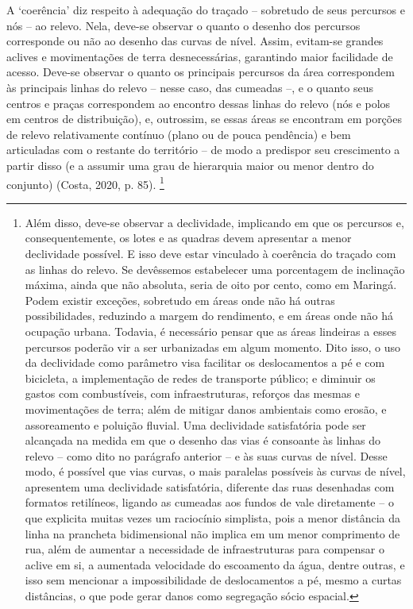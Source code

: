 \documentclass[12pt, a4paper]{book} %
\begin{document}
        A `coerência' diz respeito à adequação do traçado – sobretudo de seus percursos e nós – ao relevo. Nela, deve-se observar o quanto o desenho dos percursos corresponde ou não ao desenho das curvas de nível. Assim, evitam-se grandes aclives e movimentações de terra desnecessárias, garantindo maior facilidade de acesso. Deve-se observar o quanto os principais percursos da área correspondem às principais linhas do relevo – nesse caso, das cumeadas –, e o quanto seus centros e praças correspondem ao encontro dessas linhas do relevo (nós e polos em centros de distribuição), e, outrossim, se essas áreas se encontram em porções de relevo relativamente contínuo (plano ou de pouca pendência) e bem articuladas com o restante do território – de modo a predispor seu crescimento a partir disso (e a assumir uma grau de hierarquia maior ou menor dentro do conjunto) (Costa, 2020, p. 85). \footnote[102]{Além disso, deve-se observar a declividade, implicando em que os percursos e, consequentemente, os lotes e as quadras devem apresentar a menor declividade possível. E isso deve estar vinculado à coerência do traçado com as linhas do relevo. Se devêssemos estabelecer uma porcentagem de inclinação máxima, ainda que não absoluta, seria de oito por cento, como em Maringá. Podem existir exceções, sobretudo em áreas onde não há outras possibilidades, reduzindo a margem do rendimento, e em áreas onde não há ocupação urbana. Todavia, é necessário pensar que as áreas lindeiras a esses percursos poderão vir a ser urbanizadas em algum momento. Dito isso, o uso da declividade como parâmetro visa facilitar os deslocamentos a pé e com bicicleta, a implementação de redes de transporte público; e diminuir os gastos com combustíveis, com infraestruturas, reforços das mesmas e movimentações de terra; além de mitigar danos ambientais como erosão, e assoreamento e poluição fluvial. Uma declividade satisfatória pode ser alcançada na medida em que o desenho das vias é consoante às linhas do relevo – como dito no parágrafo anterior – e às suas curvas de nível. Desse modo, é possível que vias curvas, o mais paralelas possíveis às curvas de nível, apresentem uma declividade satisfatória, diferente das ruas desenhadas com formatos retilíneos, ligando as cumeadas aos fundos de vale diretamente – o que explicita muitas vezes um raciocínio simplista, pois a menor distância da linha na prancheta bidimensional não implica em um menor comprimento de rua, além de aumentar a necessidade de infraestruturas para compensar o aclive em si, a aumentada velocidade do escoamento da água, dentre outras, e isso sem mencionar a impossibilidade de deslocamentos a pé, mesmo a curtas distâncias, o que pode gerar danos como segregação sócio espacial.}
\end{document}
